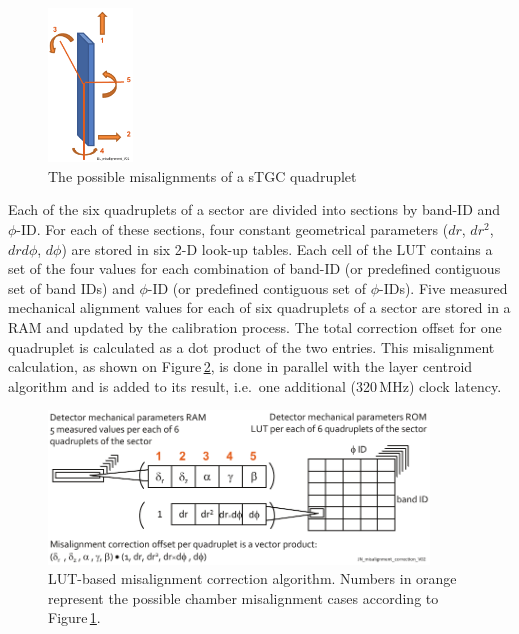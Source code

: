 \begin{figure}[h]
   \centering
   \includegraphics[width=0.2\textwidth]{figures/DL_misalignment_V01.pdf}
   \caption{The possible misalignments of a sTGC quadruplet}
   \label{fig:DL_misalignment}
\end{figure}

Each of the six quadruplets of a sector are divided into sections by band-ID and $\phi$-ID.
For each of these sections, four constant geometrical parameters ($dr$, $dr^{2}$, $dr d\phi$, $d\phi$) are stored in six 2-D look-up tables.
Each cell of the LUT contains a set of the four values for each combination of band-ID
(or predefined contiguous set of band IDs) and $\phi$-ID (or predefined contiguous set of $\phi$-IDs).
Five measured mechanical alignment values for each of six quadruplets of a sector are stored in a RAM and updated by the calibration process.
The total correction offset for one quadruplet is calculated as a dot product of the two entries.
This misalignment calculation, as shown on Figure\,\ref{fig:JN_misalignment_correction},
is done in parallel with the layer centroid algorithm and is added to its result, i.e.\ one additional (320\,MHz) clock latency.

\begin{figure}[h]
   \centering
   \includegraphics[width=0.9\textwidth]{figures/JN_misalignment_correction_V02.pdf}
   \caption{LUT-based misalignment correction algorithm. Numbers in orange represent the possible chamber misalignment cases according to Figure\,\ref{fig:DL_misalignment}.}
   \label{fig:JN_misalignment_correction}
\end{figure}

\FloatBarrier


